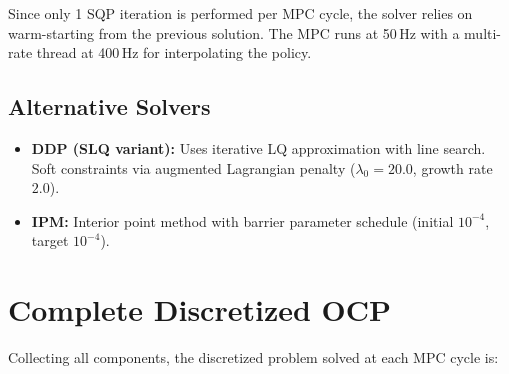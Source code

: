 \documentclass[11pt,a4paper]{article}
\begin{document}
Since only 1 SQP iteration is performed per MPC cycle, the solver relies on warm-starting from the previous solution. The MPC runs at 50\,Hz with a multi-rate thread at 400\,Hz for interpolating the policy.

\subsection{Alternative Solvers}

\begin{itemize}
	\item \textbf{DDP (SLQ variant):} Uses iterative LQ approximation with line search. Soft constraints via augmented Lagrangian penalty ($\lambda_0 = 20.0$, growth rate $2.0$).
	\item \textbf{IPM:} Interior point method with barrier parameter schedule (initial $10^{-4}$, target $10^{-4}$).
\end{itemize}


\section{Complete Discretized OCP}
\label{sec:discrete_ocp}

Collecting all components, the discretized problem solved at each MPC cycle is:
\end{document}
